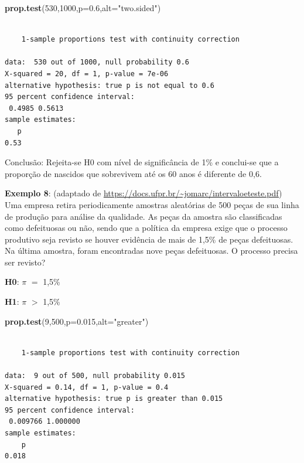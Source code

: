 \documentclass[12pt,brazil,oneside]{book}
\newenvironment{Shaded}{\begin{snugshade}}{\end{snugshade}}
\newcommand{\DataTypeTok}[1]{\textcolor[rgb]{0.13,0.29,0.53}{#1}}
\newcommand{\DecValTok}[1]{\textcolor[rgb]{0.00,0.00,0.81}{#1}}
\newcommand{\FloatTok}[1]{\textcolor[rgb]{0.00,0.00,0.81}{#1}}
\newcommand{\KeywordTok}[1]{\textcolor[rgb]{0.13,0.29,0.53}{\textbf{#1}}}
\newcommand{\NormalTok}[1]{#1}
\newcommand{\StringTok}[1]{\textcolor[rgb]{0.31,0.60,0.02}{#1}}
\begin{document}
\begin{Shaded}
\begin{Highlighting}[]
\KeywordTok{prop.test}\NormalTok{(}\DecValTok{530}\NormalTok{,}\DecValTok{1000}\NormalTok{,}\DataTypeTok{p=}\FloatTok{0.6}\NormalTok{,}\DataTypeTok{alt=}\StringTok{"two.sided"}\NormalTok{)}
\end{Highlighting}
\end{Shaded}

\begin{verbatim}

    1-sample proportions test with continuity correction

data:  530 out of 1000, null probability 0.6
X-squared = 20, df = 1, p-value = 7e-06
alternative hypothesis: true p is not equal to 0.6
95 percent confidence interval:
 0.4985 0.5613
sample estimates:
   p 
0.53 
\end{verbatim}

Conclusão: Rejeita-se H0 com nível de significância de 1\% e conclui-se
que a proporção de nascidos que sobrevivem até os 60 anos é diferente de
0,6.

\textbf{Exemplo 8}: (adaptado de
\url{https://docs.ufpr.br/~jomarc/intervaloeteste.pdf}) Uma empresa
retira periodicamente amostras aleatórias de 500 peças de sua linha de
produção para análise da qualidade. As peças da amostra são
classificadas como defeituosas ou não, sendo que a política da empresa
exige que o processo produtivo seja revisto se houver evidência de mais
de 1,5\% de peças defeituosas. Na última amostra, foram encontradas nove
peças defeituosas. O processo precisa ser revisto?

\textbf{H0}: \(\pi\) \(=\) 1,5\%

\textbf{H1}: \(\pi\) \(>\) 1,5\%

\begin{Shaded}
\begin{Highlighting}[]
\KeywordTok{prop.test}\NormalTok{(}\DecValTok{9}\NormalTok{,}\DecValTok{500}\NormalTok{,}\DataTypeTok{p=}\FloatTok{0.015}\NormalTok{,}\DataTypeTok{alt=}\StringTok{"greater"}\NormalTok{)}
\end{Highlighting}
\end{Shaded}

\begin{verbatim}

    1-sample proportions test with continuity correction

data:  9 out of 500, null probability 0.015
X-squared = 0.14, df = 1, p-value = 0.4
alternative hypothesis: true p is greater than 0.015
95 percent confidence interval:
 0.009766 1.000000
sample estimates:
    p 
0.018 
\end{verbatim}
\end{document}

